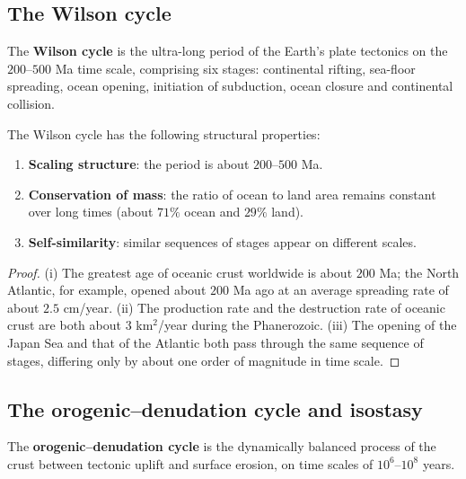\subsection{The Wilson cycle}

\begin{definition}\label{def:wilson_cycle}
The \textbf{Wilson cycle} is the ultra-long period of the Earth's plate tectonics on the $200$--$500$ Ma time scale, comprising six stages: continental rifting, sea-floor spreading, ocean opening, initiation of subduction, ocean closure and continental collision.
\end{definition}

\begin{proposition}\label{prop:wilson_structure}
The Wilson cycle has the following structural properties:
\begin{enumerate}[label=(\roman*)]
    \item \textbf{Scaling structure}: the period is about $200$--$500$ Ma.
    \item \textbf{Conservation of mass}: the ratio of ocean to land area remains constant over long times (about $71\%$ ocean and $29\%$ land).
    \item \textbf{Self-similarity}: similar sequences of stages appear on different scales.
\end{enumerate}
\end{proposition}

\begin{proof}
(i) The greatest age of oceanic crust worldwide is about $200$ Ma; the North Atlantic, for example, opened about $200$ Ma ago at an average spreading rate of about $2.5$ cm/year.
(ii) The production rate and the destruction rate of oceanic crust are both about $3$ km$^2$/year during the Phanerozoic.
(iii) The opening of the Japan Sea and that of the Atlantic both pass through the same sequence of stages, differing only by about one order of magnitude in time scale.
\end{proof}

\subsection{The orogenic--denudation cycle and isostasy}

\begin{definition}\label{def:orogenic_denudation_cycle}
The \textbf{orogenic--denudation cycle} is the dynamically balanced process of the crust between tectonic uplift and surface erosion, on time scales of $10^6$--$10^8$ years.
\end{definition}

